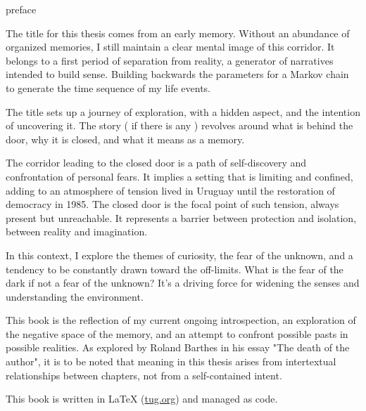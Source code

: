 \begin{center}
\Huge preface
\vspace{2cm}
\end{center}
\normalsize

The title for this thesis comes from an early memory. Without an abundance of organized memories, I still maintain a clear mental image of this corridor. It belongs to a first period of separation from reality, a generator of narratives intended to build sense. Building backwards the parameters for a Markov chain to generate the time sequence of my life events.    

The title sets up a journey of exploration, with a hidden aspect, and the intention of uncovering it. The story ( if there is any ) {r}evolves around what is behind the door, why it is closed, and what it means as a memory.

The corridor leading to the closed door is a path of self-discovery and confrontation of personal fears. It implies a setting that is limiting and confined, adding to an atmosphere of tension lived in Uruguay until the restoration of democracy in 1985. The closed door is the focal point of such tension, always present but unreachable. It represents a barrier between protection and isolation, between reality and imagination.

In this context, I explore the themes of curiosity, the fear of the unknown, and a tendency to be constantly drawn toward the off-limits. What is the fear of the dark if not a fear of the unknown? It’s a driving force for widening the senses and understanding the environment.

This book is the reflection of my current ongoing introspection, an exploration of the negative space of the memory, and an attempt to confront possible pasts in possible realities. As explored by Roland Barthes in his essay "The death of the author"\citep{barthes1967}, it is to be noted that meaning in this thesis arises from intertextual relationships between chapters, not from a self-contained intent.

This book is written in \LaTeX{} (\href{https://www.tug.org/texlive/quickinstall.html}{tug.org}) and managed as code.


